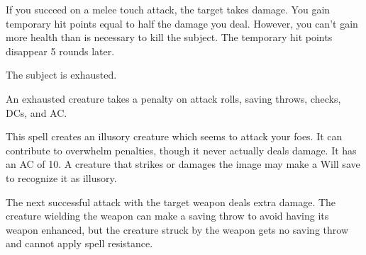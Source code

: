 \begin{spelleffect}
If you succeed on a melee touch attack, the target takes damage. You gain temporary hit points equal to half the damage you deal. However, you can't gain more health than is necessary to kill the subject. The temporary hit points disappear 5 rounds later.
\end{spelleffect}

\spellrng{\rngmed}
\begin{spelleffect}
The subject is exhausted.
\end{spelleffect}
\begin{spellnotes}
An exhausted creature takes a  penalty on attack rolls, saving throws, checks, DCs, and AC.
\end{spellnotes}

\spellrng{\rngmed}
\begin{spelleffect}
This spell creates an illusory creature which seems to attack your foes. It can contribute to overwhelm penalties, though it never actually deals damage. It has an AC of 10. A creature that strikes or damages the image may make a Will save to recognize it as illusory.
\end{spelleffect}

\spellrng{\rngclose}
\begin{spelleffect}
The next successful attack with the target weapon deals extra damage. The creature wielding the weapon can make a saving throw to avoid having its weapon enhanced, but the creature struck by the weapon gets no saving throw and cannot apply spell resistance.
\end{spelleffect}

